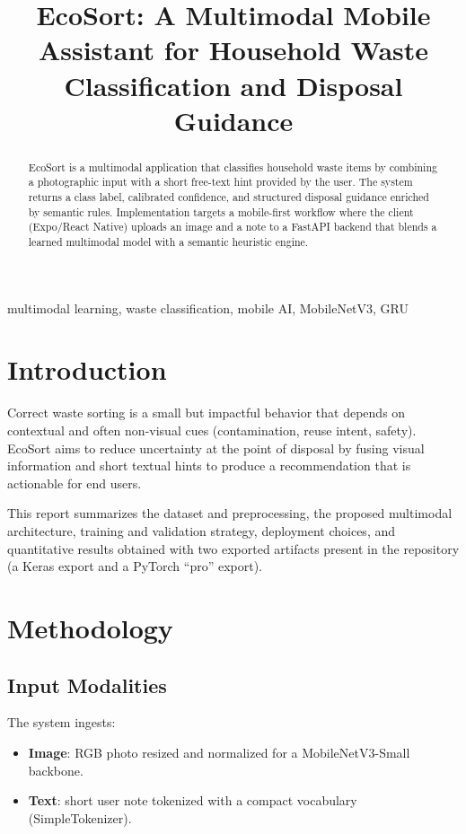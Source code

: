 \documentclass[conference]{IEEEtran}
\title{EcoSort: A Multimodal Mobile Assistant for Household Waste Classification and Disposal Guidance}
\author{
\IEEEauthorblockN{Dario Pomasqui}
\IEEEauthorblockA{Yachay Tech\\
Urcuqui, Ecuador\\
dario.pomasqui@yachaytech.edu.ec}
}
\begin{document}
\maketitle

\begin{abstract}
EcoSort is a multimodal application that classifies household waste items by combining a photographic input with a short free-text hint provided by the user. The system returns a class label, calibrated confidence, and structured disposal guidance enriched by semantic rules. Implementation targets a mobile-first workflow where the client (Expo/React Native) uploads an image and a note to a FastAPI backend that blends a learned multimodal model with a semantic heuristic engine.
\end{abstract}

\begin{IEEEkeywords}
multimodal learning, waste classification, mobile AI, MobileNetV3, GRU
\end{IEEEkeywords}

\section{Introduction}
Correct waste sorting is a small but impactful behavior that depends on contextual and often non-visual cues (contamination, reuse intent, safety). EcoSort aims to reduce uncertainty at the point of disposal by fusing visual information and short textual hints to produce a recommendation that is actionable for end users.

This report summarizes the dataset and preprocessing, the proposed multimodal architecture, training and validation strategy, deployment choices, and quantitative results obtained with two exported artifacts present in the repository (a Keras export and a PyTorch ``pro'' export).

\section{Methodology}
\subsection{Input Modalities}
The system ingests:
\begin{itemize}
	\item \textbf{Image}: RGB photo resized and normalized for a MobileNetV3-Small backbone.
	\item \textbf{Text}: short user note tokenized with a compact vocabulary (SimpleTokenizer).
\end{itemize}
\end{document}
